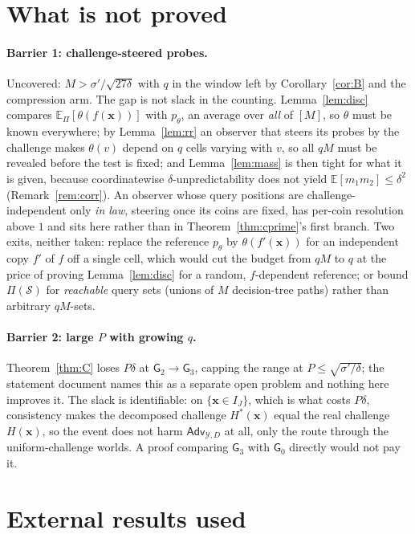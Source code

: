 \documentclass{aicr-solution}
\newcommand{\Adv}{\mathsf{Adv}}
\newcommand{\Exp}{\mathbb{E}}
\newcommand{\vx}{\mathbf{x}}
\begin{document}
\section{What is not proved}\label{sec:barriers}

\paragraph{Barrier 1: challenge-steered probes.} Uncovered:
$M>\sigma'/\sqrt{27\delta}$ with $q$ in the window left by
Corollary~\ref{cor:B} and the compression arm. The gap is not slack in the counting.
Lemma~\ref{lem:disc} compares $\Exp_\Pi[\theta(f(\vx))]$ with $p_\theta$, an
average over \emph{all} of $[M]$, so $\theta$ must be known everywhere; by
Lemma~\ref{lem:rr} an observer that steers its probes by the challenge makes
$\theta(v)$ depend on $q$ cells varying with $v$, so all $qM$ must be revealed
before the test is fixed; and Lemma~\ref{lem:mass} is then tight for what it is
given, because coordinatewise $\delta$-unpredictability does not yield
$\Exp[m_1m_2]\le\delta^{2}$ (Remark~\ref{rem:corr}). An observer whose query
positions are challenge-independent only \emph{in law}, steering once its coins
are fixed, has per-coin resolution above $1$ and sits here rather than in
Theorem~\ref{thm:cprime}'s first branch. Two exits, neither taken: replace the
reference $p_\theta$ by $\theta(f'(\vx))$ for an independent copy $f'$ of $f$ off
a single cell, which would cut the budget from $qM$ to $q$ at the price of
proving Lemma~\ref{lem:disc} for a random, $f$-dependent reference; or bound
$\Pi(\mathcal S)$ for \emph{reachable} query sets (unions of $M$
decision-tree paths) rather than arbitrary $qM$-sets.

\paragraph{Barrier 2: large $P$ with growing $q$.} Theorem~\ref{thm:C} loses
$P\delta$ at $\mathsf G_2\to\mathsf G_3$, capping the range at
$P\le\sqrt{\sigma'/\delta}$; the statement document names this as a separate open
problem and nothing here improves it. The slack is identifiable: on
$\{\vx\in I_J\}$, which is what costs $P\delta$, consistency makes the decomposed
challenge $H^{*}(\vx)$ equal the real challenge $H(\vx)$, so the event does not
harm $\Adv_{\mathcal Y,D}$ at all, only the route through the uniform-challenge
worlds. A proof comparing $\mathsf G_3$ with $\mathsf G_0$ directly would not pay
it.

\section{External results used}
\end{document}
